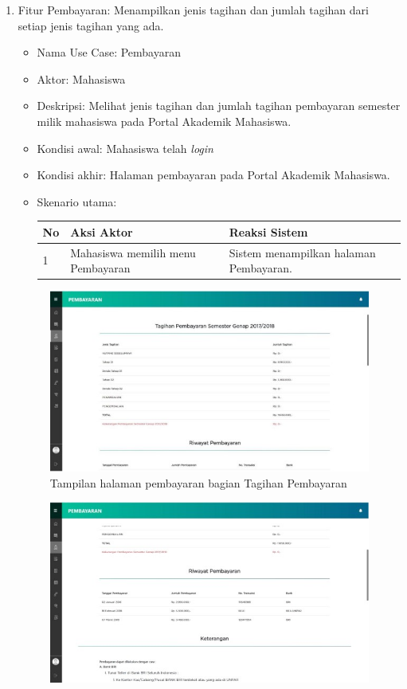 \begin{enumerate}
	
	\item Fitur Pembayaran: Menampilkan jenis tagihan dan jumlah tagihan dari setiap jenis tagihan yang ada.
	\begin{itemize}
		\item Nama Use Case: Pembayaran
		\item Aktor: Mahasiswa
		\item Deskripsi: Melihat jenis tagihan dan jumlah tagihan pembayaran semester milik mahasiswa pada Portal Akademik Mahasiswa.
		\item Kondisi awal: Mahasiswa telah \textit{login}
		\item Kondisi akhir: Halaman pembayaran pada Portal Akademik Mahasiswa.
		\item Skenario utama:
		\begin{table}[h!]
			\centering
			\label{}
			\begin{tabular}{ | m{0.5cm} | m{7cm}| m{6cm} | } 
				\hline
				No & Aksi Aktor & Reaksi Sistem \\ 
				\hline
				1 & Mahasiswa memilih menu Pembayaran & Sistem menampilkan halaman Pembayaran.
				\\ 
				\hline
			\end{tabular}
		\end{table}	
	\end{itemize}
	\begin{figure}[H]
		\centering
		\includegraphics[scale=0.7]{Gambar/bayar2018.jpg}
		\caption{Tampilan halaman pembayaran bagian Tagihan Pembayaran} 
		\label{fig:bayar_2018}
	\end{figure}
	\begin{figure}[H]
		\centering
		\includegraphics[scale=0.7]{Gambar/riwayat2018.jpg}

\end{figure}
\end{enumerate}
